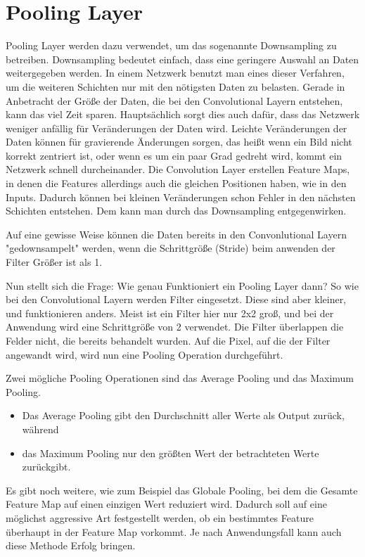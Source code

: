 \documentclass[12pt]{article}
\begin{document}
\cleardoublepage
\section{Pooling Layer}
Pooling Layer werden dazu verwendet, um das sogenannte Downsampling zu betreiben. Downsampling bedeutet einfach, dass eine geringere Auswahl an Daten weitergegeben werden.
In einem Netzwerk benutzt man eines dieser Verfahren, um die weiteren Schichten nur mit den nötigsten Daten zu belasten. Gerade in Anbetracht der Größe der Daten, die bei den Convolutional Layern entstehen, kann das viel Zeit sparen. Hauptsächlich sorgt dies auch dafür, dass das Netzwerk weniger anfällig für Veränderungen der Daten wird. Leichte Veränderungen der Daten können für gravierende Änderungen sorgen, das heißt wenn ein Bild nicht korrekt zentriert ist, oder wenn es um ein paar Grad gedreht wird, kommt ein Netzwerk schnell durcheinander.
Die Convolution Layer erstellen Feature Maps, in denen die Features allerdings auch die gleichen Positionen haben, wie in den Inputs. Dadurch können bei kleinen Veränderungen schon Fehler in den nächsten Schichten entstehen. Dem kann man durch das Downsampling entgegenwirken.

Auf eine gewisse Weise können die Daten bereits in den Convonlutional Layern "gedownsampelt" werden, wenn die Schrittgröße (Stride) beim anwenden der Filter Größer ist als 1.

Nun stellt sich die Frage: Wie genau Funktioniert ein Pooling Layer dann? So wie bei den Convolutional Layern werden Filter eingesetzt. Diese sind aber kleiner, und funktionieren anders. Meist ist ein Filter hier nur 2x2 groß, und bei der Anwendung wird eine Schrittgröße von 2 verwendet. Die Filter überlappen die Felder nicht, die bereits behandelt wurden. 
Auf die Pixel, auf die der Filter angewandt wird, wird nun eine Pooling Operation durchgeführt. 

Zwei mögliche Pooling Operationen sind das Average Pooling und das Maximum Pooling. 
\begin{itemize}
  \item Das Average Pooling gibt den Durchschnitt aller Werte als Output zurück, während
  \item das Maximum Pooling nur den größten Wert der betrachteten Werte zurückgibt.
\end{itemize}
Es gibt noch weitere, wie zum Beispiel das Globale Pooling, bei dem die Gesamte Feature Map auf einen einzigen Wert reduziert wird. Dadurch soll auf eine möglichst aggressive Art festgestellt werden, ob ein bestimmtes Feature überhaupt in der Feature Map vorkommt. Je nach Anwendungsfall kann auch diese Methode Erfolg bringen.
\end{document}
